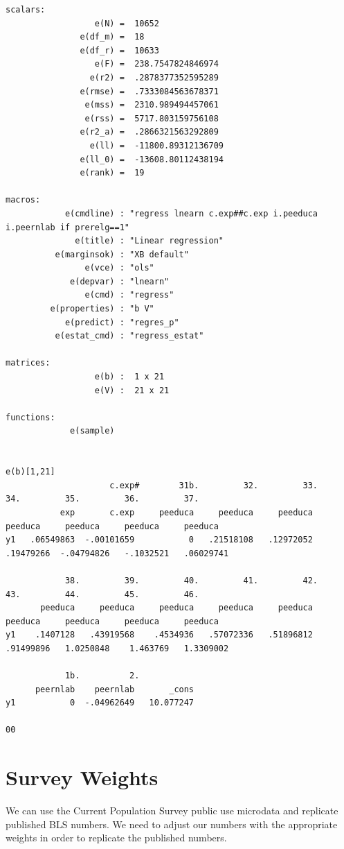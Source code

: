 \documentclass[
]{book}
\begin{document}
\begin{verbatim}
scalars:
                  e(N) =  10652
               e(df_m) =  18
               e(df_r) =  10633
                  e(F) =  238.7547824846974
                 e(r2) =  .2878377352595289
               e(rmse) =  .7333084563678371
                e(mss) =  2310.989494457061
                e(rss) =  5717.803159756108
               e(r2_a) =  .2866321563292809
                 e(ll) =  -11800.89312136709
               e(ll_0) =  -13608.80112438194
               e(rank) =  19

macros:
            e(cmdline) : "regress lnearn c.exp##c.exp i.peeduca i.peernlab if prerelg==1"
              e(title) : "Linear regression"
          e(marginsok) : "XB default"
                e(vce) : "ols"
             e(depvar) : "lnearn"
                e(cmd) : "regress"
         e(properties) : "b V"
            e(predict) : "regres_p"
          e(estat_cmd) : "regress_estat"

matrices:
                  e(b) :  1 x 21
                  e(V) :  21 x 21

functions:
             e(sample)   


e(b)[1,21]
                     c.exp#        31b.         32.         33.         34.         35.         36.         37.
           exp       c.exp     peeduca     peeduca     peeduca     peeduca     peeduca     peeduca     peeduca
y1   .06549863  -.00101659           0   .21518108   .12972052   .19479266  -.04794826   -.1032521   .06029741

            38.         39.         40.         41.         42.         43.         44.         45.         46.
       peeduca     peeduca     peeduca     peeduca     peeduca     peeduca     peeduca     peeduca     peeduca
y1    .1407128   .43919568    .4534936   .57072336   .51896812   .91499896   1.0250848    1.463769   1.3309002

            1b.          2.            
      peernlab    peernlab       _cons
y1           0  -.04962649   10.077247

00
\end{verbatim}

\section{Survey Weights}\label{survey-weights}

We can use the Current Population Survey public use microdata and replicate published BLS numbers. We need to adjust our numbers with the appropriate weights in order to replicate the published numbers.
\end{document}

